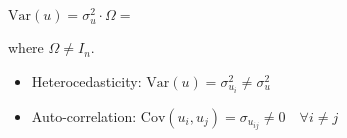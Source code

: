 \documentclass[10pt, a4paper, landscape]{extarticle}
\newcommand{\Var}{\mathrm{Var}}
\newcommand{\Cov}{\mathrm{Cov}}
\begin{document}
\begin{multicols}{3}
	\begin{center}
		$\Var(u) = \sigma^2_u \cdot \Omega =$
	\end{center}
	\quad where $\Omega \neq I_n$.
	\begin{itemize}[leftmargin=*]
		\item Heterocedasticity: $\Var(u) = \sigma^2_{u_i} \neq \sigma^2_u$
		\item Auto-correlation: $\Cov(u_i, u_j) = \sigma_{u_{ij}} \neq 0 \quad \forall i \neq j$
	\end{itemize}


\end{multicols}
\end{document}
